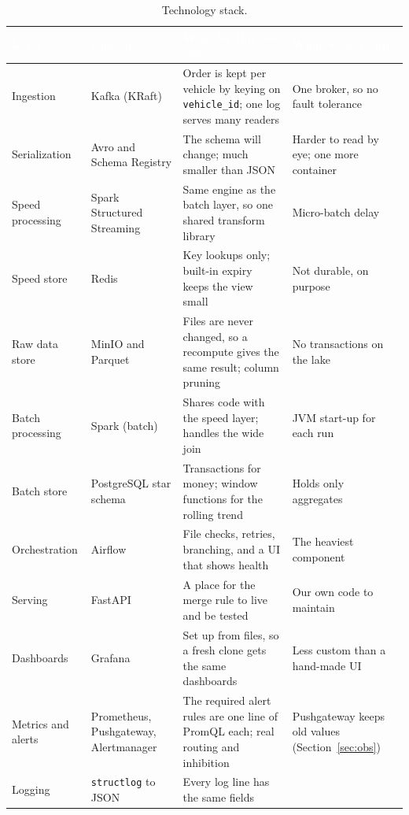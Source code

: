 \documentclass[11pt,a4paper]{article}
\newcommand{\hd}[1]{\textcolor{white}{\textbf{#1}}}
\begin{document}
\begin{table}[htbp]\centering\scriptsize
\begin{tabularx}{\linewidth}{|l|l|X|X|}
\hline
\rowcolor{tablehead}\hd{Layer} & \hd{Chosen} & \hd{Why, for this use case} & \hd{What we gave up} \\ \hline
Ingestion & Kafka (KRaft) & Order is kept per vehicle by keying on \texttt{vehicle\_id}; one log serves many readers & One broker, so no fault tolerance \\ \hline
Serialization & Avro and Schema Registry & The schema will change; much smaller than JSON & Harder to read by eye; one more container \\ \hline
Speed processing & Spark Structured Streaming & Same engine as the batch layer, so one shared transform library & Micro-batch delay \\ \hline
Speed store & Redis & Key lookups only; built-in expiry keeps the view small & Not durable, on purpose \\ \hline
Raw data store & MinIO and Parquet & Files are never changed, so a recompute gives the same result; column pruning & No transactions on the lake \\ \hline
Batch processing & Spark (batch) & Shares code with the speed layer; handles the wide join & JVM start-up for each run \\ \hline
Batch store & PostgreSQL star schema & Transactions for money; window functions for the rolling trend & Holds only aggregates \\ \hline
Orchestration & Airflow & File checks, retries, branching, and a UI that shows health & The heaviest component \\ \hline
Serving & FastAPI & A place for the merge rule to live and be tested & Our own code to maintain \\ \hline
Dashboards & Grafana & Set up from files, so a fresh clone gets the same dashboards & Less custom than a hand-made UI \\ \hline
Metrics and alerts & Prometheus, Pushgateway, Alertmanager & The required alert rules are one line of PromQL each; real routing and inhibition & Pushgateway keeps old values (Section~\ref{sec:obs}) \\ \hline
Logging & \texttt{structlog} to JSON & Every log line has the same fields & \\ \hline
\end{tabularx}
\caption{Technology stack.}
\end{table}
\end{document}
